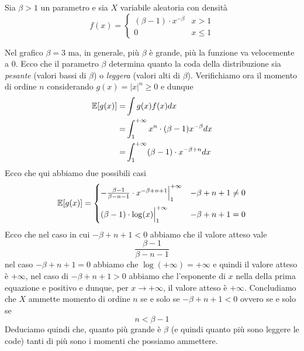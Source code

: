 \begin{example}
	Sia $\beta > 1$ un parametro e sia $X$ variabile aleatoria con densità
	\[
		f(x) = \begin{cases}
			(\beta - 1) \cdot x^{-\beta} & x > 1    \\
			0                            & x \leq 1
		\end{cases}
	\]
	\begin{center}
	\end{center}
	Nel grafico $\beta = 3$ ma, in generale, più $\beta$ è grande, più la funzione va velocemente
	a 0. Ecco che il parametro $\beta$ determina quanto la coda della distribuzione sia
	\emph{pesante} (valori bassi di $\beta$) o \emph{leggera} (valori alti di $\beta$).
	Verifichiamo ora il momento di ordine $n$ considerando $g(x) = |x|^n \geq 0$ e dunque
	\begin{align*}
		\mathbb{E}[g(x)] = & \int g(x) f(x) dx                                    \\
		=          & \int_1^{+\infty} x^n \cdot (\beta - 1) x^{-\beta} dx \\
		=          & \int_{1}^{+\infty} (\beta-1) \cdot x^{-\beta+n} dx
	\end{align*}
	Ecco che qui abbiamo due possibili casi
	\[
		\mathbb{E}[g(x)] = \begin{cases}
			-\frac{\beta-1}{\beta-n-1} \cdot x^{-\beta+n+1} \Big|_1^{+\infty}
			                                          & -\beta+n+1 \neq 0 \\[2ex]
			(\beta-1) \cdot \log(x) \Big|_1^{+\infty} & -\beta+n+1=0
		\end{cases}
	\]
	Ecco che nel caso in cui $-\beta+n+1 < 0$ abbiamo che il valore atteso vale
	\[ \frac{\beta-1}{\beta-n-1} \]
	nel caso $-\beta+n+1 = 0$ abbiamo che $\log(+\infty) = +\infty$ e quindi il valore atteso è
	$+\infty$, nel caso di $-\beta+n+1 > 0$ abbiamo che l'esponente di $x$ nella della prima
	equazione e positivo e dunque, per $x \to +\infty$, il valore atteso è $+\infty$. Concludiamo
	che $X$ ammette momento di ordine $n$ se e solo se $-\beta+n+1 < 0$ ovvero se e solo se
	\[ n < \beta - 1 \]
	Deduciamo quindi che, quanto più grande è $\beta$ (e quindi quanto più sono leggere le code)
	tanti di più sono i momenti che possiamo ammettere.
\end{example}

